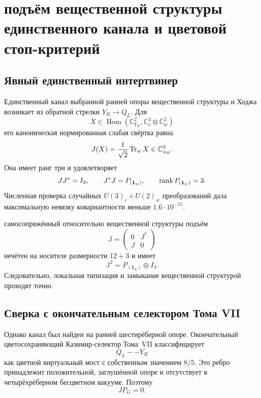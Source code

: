 \chapter{подъём вещественной структуры единственного канала и цветовой стоп-критерий}
\label{ch:v8-qlyr-ur-real-connector-lift-gate}

\section{Явный единственный интертвинер}

Единственный канал выбранной ранней опоры вещественной структуры и Ходжа возникает из обратной
стрелки $Y_R\to Q_L$. Для
\begin{equation}
 X\in\operatorname{Hom}(\mathbb C^2_{Y_R},
 \mathbb C^3_c\otimes\mathbb C^2_w)
\end{equation}
его каноническая нормированная слабая свёртка равна
\begin{equation}
 J(X)=\frac1{\sqrt2}\operatorname{Tr}_wX\in\mathbb C^3_{u_R}.
 \label{eq:v8-qlyr-weak-trace}
\end{equation}
Она имеет ранг три и удовлетворяет
\begin{equation}
 JJ^*=I_3,\qquad J^*J=P_{(\mathbf1_w)},\qquad\operatorname{rank} P_{(\mathbf1_w)}=3.
\end{equation}
Численная проверка случайных $U(3)_c\times U(2)_w$ преобразований дала
максимальную невязку ковариантности меньше $1.6\cdot10^{-15}$.

самосопряжённый относительно вещественной структуры подъём
\begin{equation}
 \mathbb J=\begin{pmatrix}0&J^*\\J&0\end{pmatrix}
\end{equation}
нечётен на носителе размерности $12+3$ и имеет
\begin{equation}
 \mathbb J^2=P_{(\mathbf1_w)}\oplus I_3.
\end{equation}
Следовательно, локальная типизация и замыкание вещественной структурой проходят точно.

\section{Сверка с окончательным селектором Тома VII}

Однако канал был найден на ранней шестирёберной опоре. Окончательный
цветосохраняющий Казимир-селектор Тома~VII классифицирует
\begin{equation}
 Q_L--Y_R
\end{equation}
как цветной виртуальный мост с собственным значением $8/5$. Это ребро
принадлежит положительной, заглушённой опоре и отсутствует в четырёхрёберном
бесцветном вакууме. Поэтому
\begin{equation}
 J P_G=0.
 \label{eq:v8-qlyr-color-projection-zero}
\end{equation}

